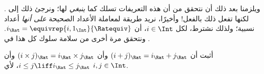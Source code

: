 \documentclass[../../../include/open-logic-section]{subfiles}
\begin{document}
ويلزمنا بعد ذلك أن نتحقق من أن هذه التعريفات تسلك كما \emph{ينبغي} لها؛
ونرجئ ذلك إلى . لكنها تفعل ذلك بالفعل!{} وأخيرًا، نريد
طريقة لمعاملة الأعداد الصحيحة \emph{على أنها} أعداد نسبية؛ ولذلك نشترط،
لكل $i \in \Int$، أن $i_\Rat =
\equivrep{i, 1_\Int}{\Ratequiv}$. ونتحقق مرة أخرى من سلامة سلوك كل هذا
في .

\begin{prob}
أثبت أن $(i + j)_\Rat = i_\Rat+ j_\Rat$ وأن $(i \times j)_\Rat =
i_\Rat \times j_\Rat$ وأن $i \leq j \liff i_\Rat \leq j_\Rat$، لأي
$i, j \in \Int$.
\end{prob}
\end{document}
